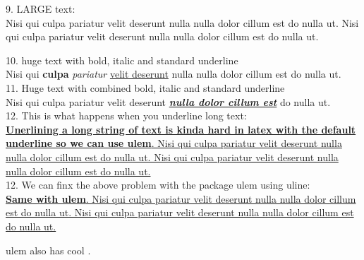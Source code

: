 \documentclass[12pt]{article}
\begin{document}
9. LARGE text: \\
{\LARGE \indent Nisi qui culpa pariatur velit deserunt nulla nulla dolor cillum est do nulla ut. Nisi qui culpa pariatur velit deserunt nulla nulla dolor cillum est do nulla ut.}

10. huge text with bold, italic and standard underline \\
{\huge \indent Nisi qui \textbf{culpa} \textit{pariatur} \underline{velit deserunt} nulla nulla dolor cillum est do nulla ut.} \\

11. Huge text with combined bold, italic and standard underline \\
{\Huge \indent Nisi qui culpa pariatur velit deserunt \underline{\textbf{\textit{nulla dolor cillum est}}} do nulla ut.} \\

12. This is what happens when you underline long text: \\
\underline{\textbf{Unerlining a long string of text is kinda hard in latex with the default underline so we can use ulem}. Nisi qui culpa pariatur velit deserunt nulla nulla dolor cillum est do nulla ut. Nisi qui culpa pariatur velit deserunt nulla nulla dolor cillum est do nulla ut.} \\

12. We can finx the above problem with the package ulem using uline: \\
\uline{\textbf{Same with ulem}. Nisi qui culpa pariatur velit deserunt nulla nulla dolor cillum est do nulla ut. Nisi qui culpa pariatur velit deserunt nulla nulla dolor cillum est do nulla ut.}

{\large \noindent ulem also has  cool .}
\end{document}
